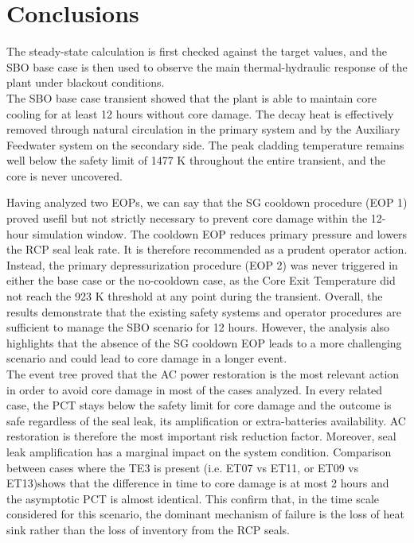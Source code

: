 \documentclass[a4paper,11pt]{article}
\numberwithin{subsubsection}{subsection}
\numberwithin{subsection}{section}
\begin{document}
\section{Conclusions}

The steady-state calculation is first checked against the target values, and the SBO base case is then used to observe the main thermal-hydraulic response of the plant under blackout conditions. \\

The SBO base case transient showed that the plant is able to maintain core cooling for at least 12 hours without core damage. The decay heat is effectively removed through natural circulation in the primary system and by the Auxiliary Feedwater system on the secondary side. The peak cladding temperature remains well below the safety limit of 1477 K throughout the entire transient, and the core is never uncovered. 

Having analyzed two EOPs, we can say that the SG cooldown procedure (EOP 1) proved usefil but not strictly necessary to prevent core damage within the 12-hour simulation window. The cooldown EOP reduces primary pressure and lowers the RCP seal leak rate. It is therefore recommended as a prudent operator action. Instead, the primary depressurization procedure (EOP 2) was never triggered in either the base case or the no-cooldown case, as the Core Exit Temperature did not reach the 923 K threshold at any point during the transient. 
Overall, the results demonstrate that the existing safety systems and operator procedures are sufficient to manage the SBO scenario for 12 hours. However, the analysis also highlights that the absence of the SG cooldown EOP leads to a more challenging scenario and could lead to core damage in a longer event. \\

The event tree proved that the AC power restoration is the most relevant action in order to avoid core damage in most of the cases analyzed. In every related case, the PCT stays below the safety limit for core damage and the outcome is safe regardless of the seal leak, its amplification or extra-batteries availability. AC restoration is therefore the most important risk reduction factor. Moreover, seal leak amplification has a marginal impact on the system condition. Comparison between cases where the TE3 is present (i.e. ET07 vs ET11, or ET09 vs ET13)shows that the difference in time to core damage is at most 2 hours and the asymptotic PCT is almost identical. This confirm that, in the time scale considered for this scenario, the dominant mechanism of failure is the loss of heat sink rather than the loss of inventory from the RCP seals. \\ 
\end{document}
